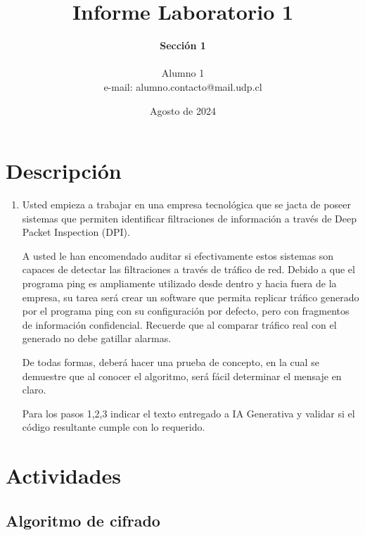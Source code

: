 \documentclass[letter,12pt]{article}
\begin{document}
%
   \title{\Huge{Informe Laboratorio 1}}

   \author{\textbf{Sección 1} \\  \\Alumno 1 \\ e-mail: alumno.contacto@mail.udp.cl}
          
   \date{Agosto de 2024}

   \maketitle
   
   \tableofcontents
 
  \newpage
  

\section{Descripción}

\begin{enumerate}
    \item  Usted empieza a trabajar en una empresa tecnológica que se jacta de poseer sistemas que permiten identificar filtraciones de información a través de Deep Packet Inspection (DPI).
    
    A usted le han encomendado auditar si efectivamente estos sistemas son capaces de detectar las filtraciones a través de tráfico de red. Debido a que el programa ping es ampliamente utilizado desde dentro y hacia fuera de la empresa, su tarea será crear un software que permita replicar tráfico generado por el programa ping con su configuración por defecto, pero con fragmentos de información confidencial. Recuerde que al comparar tráfico real con el generado no debe gatillar alarmas.
    
    De todas formas, deberá hacer una prueba de concepto, en la cual se demuestre que al conocer el algoritmo, será fácil determinar el mensaje en claro.
    
    Para los pasos 1,2,3 indicar el texto entregado a IA Generativa y validar si el código resultante cumple con lo requerido.

\end{enumerate}


\section{Actividades}


\subsection{Algoritmo de cifrado}
\end{document}
